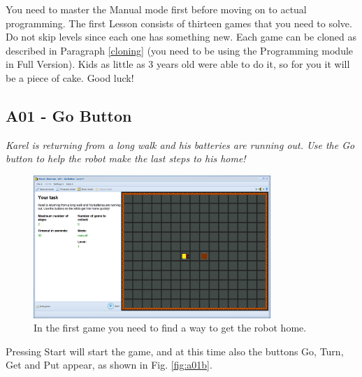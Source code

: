 \documentclass[article,A4,12pt]{llncs}
\begin{document}
You need to master the Manual mode first before moving on to actual
programming. The first Lesson consists of thirteen games that you need to 
solve. Do not skip levels since each one has something new. Each game can 
be cloned as described in Paragraph \ref{cloning} (you need to be using the 
Programming module in Full Version). 
Kids as little as 3 years old were able to do it, so for you it will be a piece 
of cake. Good luck!

\newpage

\subsection{A01 - Go Button}

{\em Karel is returning from a long walk and his batteries are running out. 
Use the Go button to help the robot make the last steps to his home! }\\[-7mm]

\begin{figure}[!ht]
\begin{center}
\includegraphics[width=0.8\textwidth]{img/a01.png}
\end{center}
\vspace{-4mm}
\caption{In the first game you need to find a way to get the robot home.}
\label{fig:a01}
\vspace{-4mm}
\end{figure}
\noindent
Pressing Start will start 
the game, and at this time also the buttons Go, Turn, Get and Put appear, 
as shown in Fig. \ref{fig:a01b}.\\[-7mm]
\end{document}
